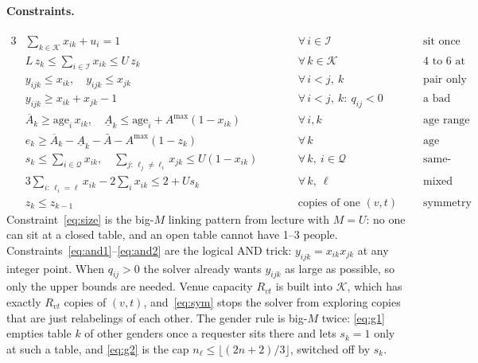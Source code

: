 \documentclass[10pt]{article}
\newcommand{\I}{\mathcal{I}}
\newcommand{\Q}{\mathcal{Q}}
\newcommand{\K}{\mathcal{K}}
\begin{document}
\paragraph{Constraints.}
\begin{alignat}{3}
&\textstyle\sum_{k\in\K} x_{ik} + u_i = 1 &\qquad& \forall\, i\in\I &\qquad& \text{sit once or be left out} \label{eq:assign}\\
&L\,z_k \le \textstyle\sum_{i\in\I} x_{ik} \le U\,z_k && \forall\, k\in\K && \text{4 to 6 at an open table} \label{eq:size}\\
&y_{ijk}\le x_{ik},\quad y_{ijk}\le x_{jk} && \forall\, i<j,\ k && \text{pair only if both sit there} \label{eq:and1}\\
&y_{ijk}\ge x_{ik}+x_{jk}-1 && \forall\, i<j,\ k:\ q_{ij}<0 && \text{a bad pair cannot hide} \label{eq:and2}\\
&\overline{A}_k \ge \text{age}_i\,x_{ik},\quad \underline{A}_k \le \text{age}_i + A^{\max}(1-x_{ik}) && \forall\, i,k && \text{age range} \label{eq:age}\\
&e_k \ge \overline{A}_k - \underline{A}_k - \bar A - A^{\max}(1-z_k) && \forall\, k && \text{age spread} \\
&s_k \le \textstyle\sum_{i\in\Q} x_{ik},\quad \sum_{j:\,\ell_j\neq\ell_i} x_{jk} \le U(1-x_{ik}) && \forall\, k,\ i\in\Q && \text{same-gender request} \label{eq:g1}\\
&3\textstyle\sum_{i:\,\ell_i=\ell} x_{ik} - 2\sum_{i} x_{ik} \le 2 + U s_k && \forall\, k,\ \ell && \text{mixed otherwise} \label{eq:g2}\\
&z_k \le z_{k-1} && \text{copies of one } (v,t) && \text{symmetry breaking} \label{eq:sym}
\end{alignat}
Constraint~\eqref{eq:size} is the big-$M$ linking pattern from lecture with $M=U$: no one can sit at a closed table, and an open table cannot have 1--3 people. Constraints~\eqref{eq:and1}--\eqref{eq:and2} are the logical AND trick: $y_{ijk}=x_{ik}x_{jk}$ at any integer point. When $q_{ij}>0$ the solver already wants $y_{ijk}$ as large as possible, so only the upper bounds are needed. Venue capacity $R_{vt}$ is built into $\K$, which has exactly $R_{vt}$ copies of $(v,t)$, and~\eqref{eq:sym} stops the solver from exploring copies that are just relabelings of each other. The gender rule is big-$M$ twice: \eqref{eq:g1} empties table $k$ of other genders once a requester sits there and lets $s_k=1$ only at such a table, and \eqref{eq:g2} is the cap $n_\ell\le\lfloor(2n+2)/3\rfloor$, switched off by $s_k$.
\end{document}
